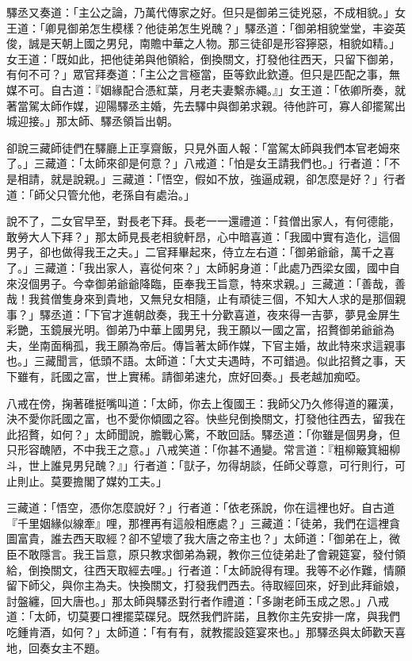 驛丞又奏道：「主公之論，乃萬代傳家之好。但只是御弟三徒兇惡，不成相貌。」女王道：「卿見御弟怎生模樣？他徒弟怎生兇醜？」驛丞道：「御弟相貌堂堂，丰姿英俊，誠是天朝上國之男兒，南贍中華之人物。那三徒卻是形容獰惡，相貌如精。」女王道：「既如此，把他徒弟與他領給，倒換關文，打發他往西天，只留下御弟，有何不可？」眾官拜奏道：「主公之言極當，臣等欽此欽遵。但只是匹配之事，無媒不可。自古道：『姻緣配合憑紅葉，月老夫妻繫赤繩。』」女王道：「依卿所奏，就著當駕太師作媒，迎陽驛丞主婚，先去驛中與御弟求親。待他許可，寡人卻擺駕出城迎接。」那太師、驛丞領旨出朝。

卻說三藏師徒們在驛廳上正享齋飯，只見外面人報：「當駕太師與我們本官老姆來了。」三藏道：「太師來卻是何意？」八戒道：「怕是女王請我們也。」行者道：「不是相請，就是說親。」三藏道：「悟空，假如不放，強逼成親，卻怎麼是好？」行者道：「師父只管允他，老孫自有處治。」

說不了，二女官早至，對長老下拜。長老一一還禮道：「貧僧出家人，有何德能，敢勞大人下拜？」那太師見長老相貌軒昂，心中暗喜道：「我國中實有造化，這個男子，卻也做得我王之夫。」二官拜畢起來，侍立左右道：「御弟爺爺，萬千之喜了。」三藏道：「我出家人，喜從何來？」太師躬身道：「此處乃西梁女國，國中自來沒個男子。今幸御弟爺爺降臨，臣奉我王旨意，特來求親。」三藏道：「善哉，善哉！我貧僧隻身來到貴地，又無兒女相隨，止有頑徒三個，不知大人求的是那個親事？」驛丞道：「下官才進朝啟奏，我王十分歡喜道，夜來得一吉夢，夢見金屏生彩艷，玉鏡展光明。御弟乃中華上國男兒，我王願以一國之富，招贅御弟爺爺為夫，坐南面稱孤，我王願為帝后。傳旨著太師作媒，下官主婚，故此特來求這親事也。」三藏聞言，低頭不語。太師道：「大丈夫遇時，不可錯過。似此招贅之事，天下雖有，託國之富，世上實稀。請御弟速允，庶好回奏。」長老越加痴啞。

八戒在傍，掬著碓挺嘴叫道：「太師，你去上復國王：我師父乃久修得道的羅漢，決不愛你託國之富，也不愛你傾國之容。快些兒倒換關文，打發他往西去，留我在此招贅，如何？」太師聞說，膽戰心驚，不敢回話。驛丞道：「你雖是個男身，但只形容醜陋，不中我王之意。」八戒笑道：「你甚不通變。常言道：『粗柳簸箕細柳斗，世上誰見男兒醜？』」行者道：「獃子，勿得胡談，任師父尊意，可行則行，可止則止。莫要擔閣了媒妁工夫。」

三藏道：「悟空，憑你怎麼說好？」行者道：「依老孫說，你在這裡也好。自古道『千里姻緣似線牽』哩，那裡再有這般相應處？」三藏道：「徒弟，我們在這裡貪圖富貴，誰去西天取經？卻不望壞了我大唐之帝主也？」太師道：「御弟在上，微臣不敢隱言。我王旨意，原只教求御弟為親，教你三位徒弟赴了會親筵宴，發付領給，倒換關文，往西天取經去哩。」行者道：「太師說得有理。我等不必作難，情願留下師父，與你主為夫。快換關文，打發我們西去。待取經回來，好到此拜爺娘，討盤纏，回大唐也。」那太師與驛丞對行者作禮道：「多謝老師玉成之恩。」八戒道：「太師，切莫要口裡擺菜碟兒。既然我們許諾，且教你主先安排一席，與我們吃鍾肯酒，如何？」太師道：「有有有，就教擺設筵宴來也。」那驛丞與太師歡天喜地，回奏女主不題。

